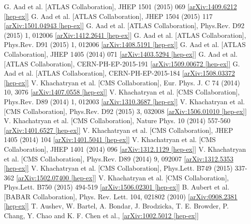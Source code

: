 \documentclass[10pt]{article}
\begin{document}
\begin{thebibliography}{00}
 G. Aad et al. [ATLAS Collaboration], JHEP 1501 (2015) 069 \href{http://arxiv.org/abs/1409.6212}{[arXiv:1409.6212 [hep-ex]]}
 G. Aad et al. [ATLAS Collaboration], JHEP 1504 (2015) 117 \href{http://arxiv.org/abs/1501.04943}{[arXiv:1501.04943 [hep-ex]]}
 G. Aad et al. [ATLAS Collaboration], Phys.Rev. D92 (2015) 1, 012006 \href{http://arxiv.org/abs/1412.2641}{[arXiv:1412.2641 [hep-ex]]}
 G. Aad et al. [ATLAS Collaboration], Phys.Rev. D91 (2015) 1, 012006 \href{http://arxiv.org/abs/1408.5191}{[arXiv:1408.5191 [hep-ex]]}
 G. Aad et al. [ATLAS Collaboration], JHEP 1405 (2014) 071 \href{http://arxiv.org/abs/1403.5294}{[arXiv:1403.5294 [hep-ex]]}
 G. Aad et al. [ATLAS Collaboration], CERN-PH-EP-2015-191 \href{http://arxiv.org/abs/1509.00672}{[arXiv:1509.00672 [hep-ex]]}
 G. Aad et al. [ATLAS Collaboration], CERN-PH-EP-2015-184 \href{http://arxiv.org/abs/1508.03372}{[arXiv:1508.03372 [hep-ex]]}
 V. Khachatryan et al. [CMS Collaboration], Eur. Phys. J. C 74 (2014) 10, 3076 \href{http://arxiv.org/abs/1407.0558}{[arXiv:1407.0558 [hep-ex]]}
 V. Khachatryan et al. [CMS Collaboration], Phys.Rev. D89 (2014) 1, 012003 \href{http://arxiv.org/abs/1310.3687}{[arXiv:1310.3687 [hep-ex]]}
 V. Khachatryan et al. [CMS Collaboration], Phys.Rev. D92 (2015) 3, 032008 \href{http://arxiv.org/abs/1506.01010}{[arXiv:1506.01010 [hep-ex]]}
 V. Khachatryan et al. [CMS Collaboration], Nature Phys. 10 (2014) 557-560 \href{http://arxiv.org/abs/1401.6527}{[arXiv:1401.6527 [hep-ex]]}
 V. Khachatryan et al. [CMS Collaboration], JHEP 1405 (2014) 104 \href{http://arxiv.org/abs/1401.5041}{[arXiv:1401.5041 [hep-ex]]}
 V. Khachatryan et al. [CMS Collaboration], JHEP 1401 (2014) 096 \href{http://arxiv.org/abs/1312.1129}{[arXiv:1312.1129 [hep-ex]]}
 V. Khachatryan et al. [CMS Collaboration], Phys.Rev. D89 (2014) 9, 092007 \href{http://arxiv.org/abs/1312.5353}{[arXiv:1312.5353 [hep-ex]]}
 V. Khachatryan et al. [CMS Collaboration], Phys.Lett. B749 (2015) 337-362 \href{http://arxiv.org/abs/1502.07400}{[arXiv:1502.07400 [hep-ex]]}
 V. Khachatryan et al. [CMS Collaboration], Phys.Lett. B750 (2015) 494-519 \href{http://arxiv.org/abs/1506.02301}{[arXiv:1506.02301 [hep-ex]]}
 B. Aubert et al. [BABAR Collaboration], Phys. Rev. Lett. 104, 021802 (2010) \href{http://arxiv.org/abs/0908.2381}{[arXiv:0908.2381 [hep-ex]]}
 T. Aushev, W. Bartel, A. Bondar, J. Brodzicka, T. E. Browder, P. Chang, Y. Chao and K. F. Chen et al., \href{http://arxiv.org/abs/1002.5012}{[arXiv:1002.5012 [hep-ex]]}
\end{thebibliography}
\end{document}
